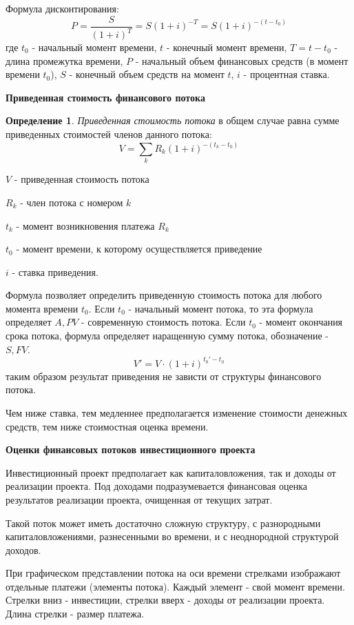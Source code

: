 \documentclass[aps,%
12pt,%
final,%
oneside,
onecolumn,%
musixtex, %
superscriptaddress,%
centertags]{article} %
\theoremstyle{plain}
\theoremstyle{definition}
\newtheorem{definition}{Определение}[subsection]
\theoremstyle{remark}
\begin{document}
Формула дисконтирования:
$$P = \frac{S}{(1+i)^T} = S(1+i)^{-T} = S(1+i)^{-(t-t_0)}$$
где $t_0$ - начальный момент времени, $t$ - конечный момент времени, $T=t-t_0$ - длина промежутка времени, $P$ - начальный объем финансовых средств (в момент времени $t_0$), $S$ - конечный объем средств на момент $t$, $i$ - процентная ставка.

\textbf{Приведенная стоимость финансового потока}

\begin{definition}
 	\textit{Приведенная стоимость потока} в общем случае равна сумме приведенных стоимостей членов данного потока:
 	$$V = \sum\limits_k R_k (1+i)^{-(t_k-t_0)}$$

 	$V$ - приведенная стоимость потока

 	$R_k$ - член потока с номером $k$

 	$t_k$ - момент возникновения платежа $R_k$

 	$t_0$ - момент времени, к которому осуществляется приведение

 	$i$ - ставка приведения.
\end{definition} 

Формула позволяет определить приведенную стоимость потока для любого момента времени $t_0$. Если $t_0$ - начальный момент потока, то эта формула определяет $A, PV$ - современную стоимость потока. Если $t_0$ - момент окончания срока потока, формула определяет наращенную сумму потока, обозначение - $S,FV$.
$$V' = V \cdot (1+i)^{t_0' - t_0}$$
таким образом результат приведения не зависти от структуры финансового потока.

Чем ниже ставка, тем медленнее предполагается изменение стоимости денежных средств, тем ниже стоимостная оценка времени.

\textbf{Оценки финансовых потоков инвестиционного проекта}

Инвестиционный проект предполагает как капиталовложения, так и доходы от реализации проекта. Под доходами подразумевается финансовая оценка результатов реализации проекта, очищенная от текущих затрат.

Такой поток может иметь достаточно сложную структуру, с разнородными капиталовложениями, разнесенными во времени, и с неоднородной структурой доходов.

При графическом представлении потока на оси времени стрелками изображают отдельные платежи (элементы потока). Каждый элемент - свой момент времени. Стрелки вниз - инвестиции, стрелки вверх - доходы от реализации проекта. Длина стрелки - размер платежа.
\end{document}
